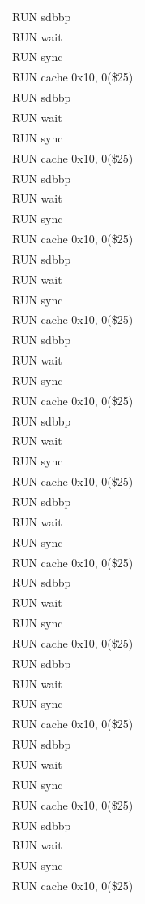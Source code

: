 \documentclass[11pt,utf8]{article}
\begin{document}
{{{{\begin{center}
\begin{longtable}{p{15cm}}
		RUN{ }sdbbp\\
		RUN{ }wait\\
		RUN{ }sync\\
		RUN{ }cache{ }0x10,{ }0(\$25)\\
		RUN{ }sdbbp\\
		RUN{ }wait\\
		RUN{ }sync\\
		RUN{ }cache{ }0x10,{ }0(\$25)\\
		RUN{ }sdbbp\\
		RUN{ }wait\\
		RUN{ }sync\\
		RUN{ }cache{ }0x10,{ }0(\$25)\\
		RUN{ }sdbbp\\
		RUN{ }wait\\
		RUN{ }sync\\
		RUN{ }cache{ }0x10,{ }0(\$25)\\
		RUN{ }sdbbp\\
		RUN{ }wait\\
		RUN{ }sync\\
		RUN{ }cache{ }0x10,{ }0(\$25)\\
		RUN{ }sdbbp\\
		RUN{ }wait\\
		RUN{ }sync\\
		RUN{ }cache{ }0x10,{ }0(\$25)\\
		RUN{ }sdbbp\\
		RUN{ }wait\\
		RUN{ }sync\\
		RUN{ }cache{ }0x10,{ }0(\$25)\\
		RUN{ }sdbbp\\
		RUN{ }wait\\
		RUN{ }sync\\
		RUN{ }cache{ }0x10,{ }0(\$25)\\
		RUN{ }sdbbp\\
		RUN{ }wait\\
		RUN{ }sync\\
		RUN{ }cache{ }0x10,{ }0(\$25)\\
		RUN{ }sdbbp\\
		RUN{ }wait\\
		RUN{ }sync\\
		RUN{ }cache{ }0x10,{ }0(\$25)\\
		RUN{ }sdbbp\\
		RUN{ }wait\\
		RUN{ }sync\\
		RUN{ }cache{ }0x10,{ }0(\$25)\\

\end{longtable}
\end{center}}}}}
\end{document}
